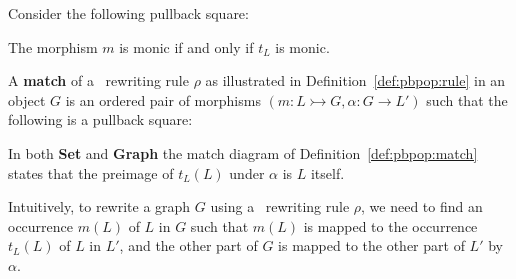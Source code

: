 \documentclass{book}
\begin{document}
    \begin{proposition}
      Consider the following pullback square:


      The morphism \(m\) is monic if and only if $t_L$ is monic.
    \end{proposition}

    \begin{definition}[Match]
      \label{def:pbpop:match}
      A \textbf{match} of a \pbpop~rewriting rule \(\rho\) as illustrated in Definition~\ref{def:pbpop:rule} in an object \(G\) is an ordered pair of morphisms \((m:L \rightarrowtail G, \alpha: G \mathop{\rightarrow} L')\) such that the following is a pullback square:
    

      \end{definition}
    
\begin{remark}
In both \textbf{Set} and \textbf{Graph} the match diagram of Definition~\ref{def:pbpop:match} states that the preimage of $t_L(L)$ under $\alpha$ is $L$ itself. 
\end{remark}
Intuitively, to rewrite a graph \(G\) using a \pbpop~rewriting rule \(\rho\), we need to find an occurrence $m(L)$ of \(L\) in \(G\) such that $m(L)$ is mapped to the occurrence $t_L(L)$ of $L$ in \(L'\), and the other part of \(G\) is mapped to the other part of \(L'\) by \(\alpha\).
\end{document}
